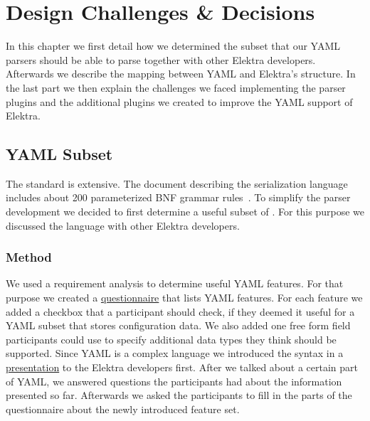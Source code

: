 \chapter{Design Challenges \& Decisions}
\label{sec:design_challenges_and_decisions}

In this chapter we first detail how we determined the subset that our YAML parsers should be able to parse together with other Elektra developers. Afterwards we describe the mapping between YAML and Elektra’s  structure. In the last part we then explain the challenges we faced implementing the parser plugins and the additional plugins we created to improve the YAML support of Elektra.

\section{YAML Subset}

The  standard is extensive. The document describing the serialization language includes about 200 parameterized \gls{BNF} grammar rules~\cite{ben2009yaml}. To simplify the parser development we decided to first determine a useful subset of . For this purpose we discussed the language with other Elektra developers.

\subsection{Method}

We used a requirement analysis to determine useful YAML features. For that purpose we created a \href{https://github.com/sanssecours/YAML-Presentation/blob/master/Questionnaire.md}{questionnaire} that lists YAML features. For each feature we added a checkbox that a participant should check, if they deemed it useful for a YAML subset that stores configuration data. We also added one free form field participants could use to specify additional data types they think should be supported. Since YAML is a complex language we introduced the  syntax in a \href{https://github.com/sanssecours/YAML-Presentation/releases/download/v1.0/Presentation.pdf}{presentation} to the Elektra developers first. After we talked about a certain part of YAML, we answered questions the participants had about the information presented so far. Afterwards we asked the participants to fill in the parts of the questionnaire about the newly introduced feature set.

